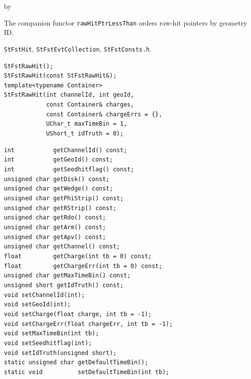 \documentclass[twoside]{article}
\newcommand{\entrylabel}[1]{\mbox{\textbf{{#1}}}\hfil}%
\newenvironment{entry}
{\begin{list}{}%
    {\renewcommand{\makelabel}{\entrylabel}%
     \setlength{\labelwidth}{90pt}%
     \setlength{\leftmargin}{\labelwidth}
     \advance\leftmargin by \labelsep%
      }%
    }%
  {\end{list}}
\newcommand{\Entrylabel}[1]%
{\raisebox{0pt}[1ex][0pt]{\makebox[\labelwidth][l]%
    {\parbox[t]{\labelwidth}{\hspace{0pt}\textbf{{#1}}}}}}
\newenvironment{Entry}%
{\renewcommand{\entrylabel}{\Entrylabel}\begin{entry}}%
  {\end{entry}}
\begin{document}
\begin{Entry}
  The companion functor \texttt{rawHitPtrLessThan} orders raw-hit pointers by geometry ID.
\item[Related Classes]
  \texttt{StFstHit}, \texttt{StFstEvtCollection}, \texttt{StFstConsts.h}.
\item[Public\\ Constructors]
    \verb+StFstRawHit();+\\
    \verb+StFstRawHit(const StFstRawHit&);+\\
    \verb+template<typename Container>+\\
    \verb+StFstRawHit(int channelId, int geoId,+\\
    \verb+            const Container& charges,+\\
    \verb+            const Container& chargeErrs = {},+\\
    \verb+            UChar_t maxTimeBin = 1,+\\
    \verb+            UShort_t idTruth = 0);+\\
\item[Public Member\\ Functions]
    \verb+int           getChannelId() const;+\\
    \verb+int           getGeoId() const;+\\
    \verb+int           getSeedhitflag() const;+\\
    \verb+unsigned char getDisk() const;+\\
    \verb+unsigned char getWedge() const;+\\
    \verb+unsigned char getPhiStrip() const;+\\
    \verb+unsigned char getRStrip() const;+\\
    \verb+unsigned char getRdo() const;+\\
    \verb+unsigned char getArm() const;+\\
    \verb+unsigned char getApv() const;+\\
    \verb+unsigned char getChannel() const;+\\
    \verb+float         getCharge(int tb = 0) const;+\\
    \verb+float         getChargeErr(int tb = 0) const;+\\
    \verb+unsigned char getMaxTimeBin() const;+\\
    \verb+unsigned short getIdTruth() const;+\\
    \verb+void setChannelId(int);+\\
    \verb+void setGeoId(int);+\\
    \verb+void setCharge(float charge, int tb = -1);+\\
    \verb+void setChargeErr(float chargeErr, int tb = -1);+\\
    \verb+void setMaxTimeBin(int tb);+\\
    \verb+void setSeedhitflag(int);+\\
    \verb+void setIdTruth(unsigned short);+\\
    \verb+static unsigned char getDefaultTimeBin();+\\
    \verb+static void          setDefaultTimeBin(int tb);+\\
\end{Entry}
\clearpage
\end{document}
